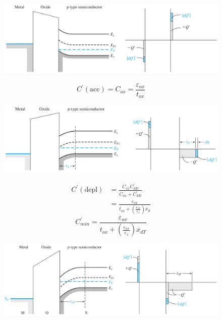 \documentclass[a4paper, twocolumn]{article}
\begin{document}
    \begin{figure}[H]
        \centering
        \includegraphics[width=0.9\linewidth]{C-V-accumulation.jpg}
        \label{fig:C-V-accumulation.jpg}
    \end{figure}
    \begin{equation*}
        C^\prime (\text{acc}) = C_{ox} = \frac{\varepsilon_{ox} }{t_{ox} }  
    \end{equation*}
    \begin{figure}[H]
        \centering
        \includegraphics[width=0.9\linewidth]{C-V-depletion.jpg}
        \label{fig:C-V-depletion.jpg}
    \end{figure}
    \begin{equation*}
        \begin{aligned}
            C^\prime (\text{depl}) &= \frac{C_{ox} C^\prime_{SD} }{C_{ox} + C^\prime_{SD} } \\
            &= \frac{\varepsilon_{ox} }{t_{ox} + \left( \frac{\varepsilon_{ox} }{\varepsilon_s}  \right)x_d } 
        \end{aligned}
    \end{equation*}
    \begin{equation*}
        C^\prime_{min} = \frac{\varepsilon_{ox} }{t_{ox} + \left( \frac{\varepsilon_{ox} }{\varepsilon_s}  \right) x_{dT} } 
    \end{equation*}
    \begin{figure}[H]
        \centering
        \includegraphics[width=0.9\linewidth]{C-V-inversion.jpg}
        \label{fig:C-V-inversion.jpg}
    \end{figure}
\end{document}
